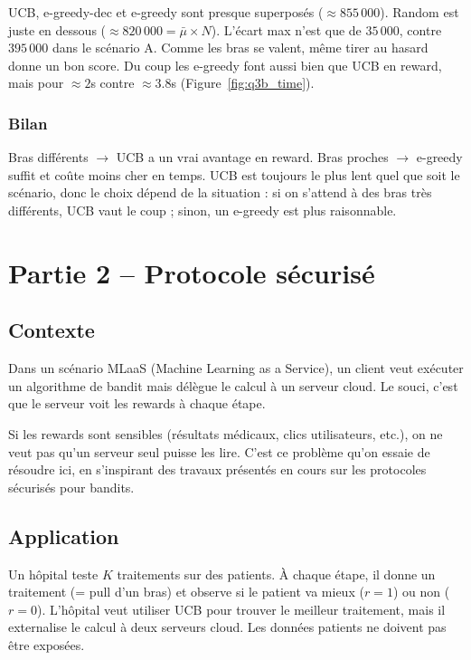 \documentclass[12pt,a4paper]{article}
\begin{document}
UCB, e-greedy-dec et e-greedy sont presque superposés ($\approx 855\,000$). Random est juste en dessous ($\approx 820\,000 = \bar{\mu} \times N$). L'écart max n'est que de $35\,000$, contre $395\,000$ dans le scénario A. Comme les bras se valent, même tirer au hasard donne un bon score. Du coup les e-greedy font aussi bien que UCB en reward, mais pour $\approx 2$s contre $\approx 3.8$s (Figure~\ref{fig:q3b_time}).

\subsubsection{Bilan}

Bras différents $\to$ UCB a un vrai avantage en reward. Bras proches $\to$ e-greedy suffit et coûte moins cher en temps. UCB est toujours le plus lent quel que soit le scénario, donc le choix dépend de la situation : si on s'attend à des bras très différents, UCB vaut le coup ; sinon, un e-greedy est plus raisonnable.

\section{Partie 2 -- Protocole sécurisé}

\subsection{Contexte}

Dans un scénario MLaaS (Machine Learning as a Service), un client veut exécuter un algorithme de bandit mais délègue le calcul à un serveur cloud. Le souci, c'est que le serveur voit les rewards à chaque étape.

Si les rewards sont sensibles (résultats médicaux, clics utilisateurs, etc.), on ne veut pas qu'un serveur seul puisse les lire. C'est ce problème qu'on essaie de résoudre ici, en s'inspirant des travaux présentés en cours sur les protocoles sécurisés pour bandits.

\subsection{Application}

Un hôpital teste $K$ traitements sur des patients. À chaque étape, il donne un traitement (= pull d'un bras) et observe si le patient va mieux ($r = 1$) ou non ($r = 0$). L'hôpital veut utiliser UCB pour trouver le meilleur traitement, mais il externalise le calcul à deux serveurs cloud. Les données patients ne doivent pas être exposées.
\end{document}
